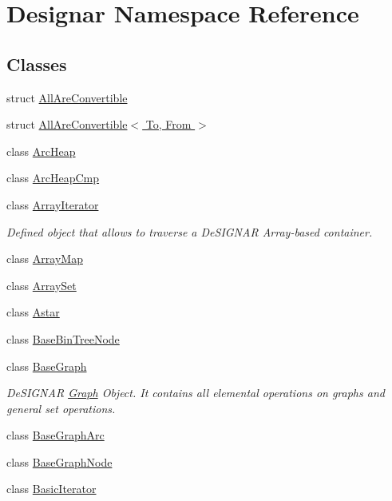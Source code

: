 \hypertarget{namespace_designar}{}\section{Designar Namespace Reference}
\label{namespace_designar}
\subsection*{Classes}
\begin{DoxyCompactItemize}
\item 
struct \hyperlink{struct_designar_1_1_all_are_convertible}{All\+Are\+Convertible}
\item 
struct \hyperlink{struct_designar_1_1_all_are_convertible_3_01_to_00_01_from_01_4}{All\+Are\+Convertible$<$ To, From $>$}
\item 
class \hyperlink{class_designar_1_1_arc_heap}{Arc\+Heap}
\item 
class \hyperlink{class_designar_1_1_arc_heap_cmp}{Arc\+Heap\+Cmp}
\item 
class \hyperlink{class_designar_1_1_array_iterator}{Array\+Iterator}
\begin{DoxyCompactList}\small\item\em Defined object that allows to traverse a De\+S\+I\+G\+N\+AR Array-\/based container. \end{DoxyCompactList}\item 
class \hyperlink{class_designar_1_1_array_map}{Array\+Map}
\item 
class \hyperlink{class_designar_1_1_array_set}{Array\+Set}
\item 
class \hyperlink{class_designar_1_1_astar}{Astar}
\item 
class \hyperlink{class_designar_1_1_base_bin_tree_node}{Base\+Bin\+Tree\+Node}
\item 
class \hyperlink{class_designar_1_1_base_graph}{Base\+Graph}
\begin{DoxyCompactList}\small\item\em De\+S\+I\+G\+N\+AR \hyperlink{class_designar_1_1_graph}{Graph} Object. It contains all elemental operations on graphs and general set operations. \end{DoxyCompactList}\item 
class \hyperlink{class_designar_1_1_base_graph_arc}{Base\+Graph\+Arc}
\item 
class \hyperlink{class_designar_1_1_base_graph_node}{Base\+Graph\+Node}
\item 
class \hyperlink{class_designar_1_1_basic_iterator}{Basic\+Iterator}

\end{DoxyCompactItemize}
